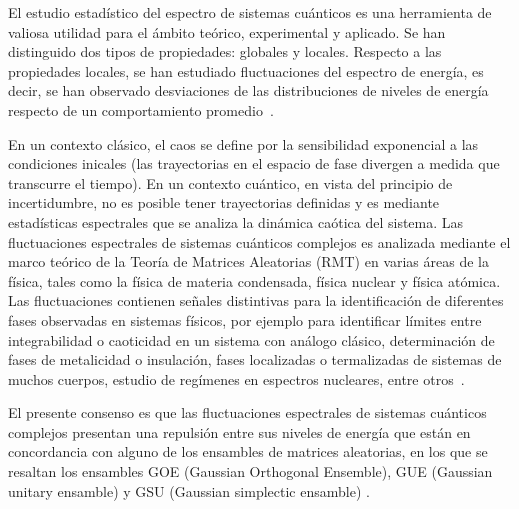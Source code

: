 \documentclass[spanish,titlepage,table]{practicas}
\begin{document}
El estudio estadístico del espectro de sistemas cuánticos es una herramienta de valiosa utilidad para el ámbito teórico, experimental y aplicado.
Se han distinguido dos tipos de propiedades: globales y locales.
Respecto a las propiedades locales, se han estudiado fluctuaciones del espectro de energía, es decir, se han observado desviaciones de las distribuciones de niveles de energía respecto de un comportamiento promedio~\cite{Bohigas_1984}.


En un contexto clásico, el caos se define por la sensibilidad exponencial a las condiciones inicales 
(las trayectorias en el espacio de fase divergen a medida que transcurre el tiempo). En un contexto cuántico, en vista del principio de incertidumbre, no es posible tener 
trayectorias definidas y es mediante estadísticas espectrales que se analiza la dinámica caótica del sistema.
Las fluctuaciones espectrales de sistemas cuánticos complejos es analizada mediante 
el marco teórico de la Teoría de Matrices Aleatorias (RMT) en varias áreas de la física, 
tales como la física de materia condensada, física nuclear y física atómica.
Las fluctuaciones contienen señales distintivas para la identificación de diferentes fases observadas 
en sistemas físicos, por ejemplo para identificar límites entre integrabilidad o caoticidad en un sistema con análogo clásico,
determinación de fases de metalicidad o insulación, fases localizadas o termalizadas de sistemas de muchos cuerpos, estudio de regímenes en espectros nucleares, entre otros~\cite{Tekur2020}.


El presente consenso es que las fluctuaciones espectrales de sistemas cuánticos complejos presentan 
una repulsión entre sus niveles de energía que están en concordancia con alguno de los ensambles de matrices 
aleatorias, en los que se resaltan los ensambles GOE (Gaussian Orthogonal Ensemble), GUE (Gaussian unitary ensamble) y GSU (Gaussian simplectic ensamble)
.
\end{document}
